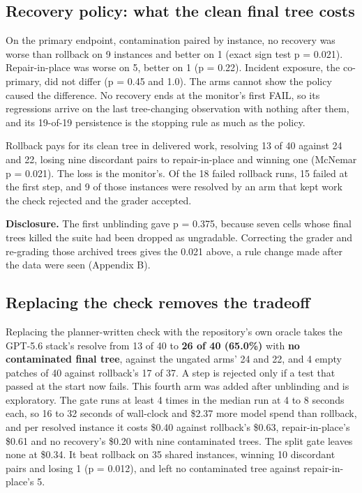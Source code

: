 \documentclass{article}
\begin{document}
\subsection{Recovery policy: what the clean final tree costs}

On the primary endpoint, contamination paired by instance, no recovery was worse than rollback on 9 instances and better on 1 (exact sign test p = 0.021). Repair-in-place was worse on 5, better on 1 (p = 0.22). Incident exposure, the co-primary, did not differ (p = 0.45 and 1.0). The arms cannot show the policy caused the difference. No recovery ends at the monitor's first FAIL, so its regressions arrive on the last tree-changing observation with nothing after them, and its 19-of-19 persistence is the stopping rule as much as the policy.

Rollback pays for its clean tree in delivered work, resolving 13 of 40 against 24 and 22, losing nine discordant pairs to repair-in-place and winning one (McNemar p = 0.021). The loss is the monitor's. Of the 18 failed rollback runs, 15 failed at the first step, and 9 of those instances were resolved by an arm that kept work the check rejected and the grader accepted.

\textbf{Disclosure.} The first unblinding gave p = 0.375, because seven cells whose final trees killed the suite had been dropped as ungradable. Correcting the grader and re-grading those archived trees gives the 0.021 above, a rule change made after the data were seen (Appendix B).

\subsection{Replacing the check removes the tradeoff}

Replacing the planner-written check with the repository's own oracle takes the GPT-5.6 stack's resolve from 13 of 40 to \textbf{26 of 40 (65.0\%)} with \textbf{no contaminated final tree}, against the ungated arms' 24 and 22, and 4 empty patches of 40 against rollback's 17 of 37. A step is rejected only if a test that passed at the start now fails. This fourth arm was added after unblinding and is exploratory. The gate runs at least 4 times in the median run at 4 to 8 seconds each, so 16 to 32 seconds of wall-clock and \$2.37 more model spend than rollback, and per resolved instance it costs \$0.40 against rollback's \$0.63, repair-in-place's \$0.61 and no recovery's \$0.20 with nine contaminated trees. The split gate leaves none at \$0.34. It beat rollback on 35 shared instances, winning 10 discordant pairs and losing 1 (p = 0.012), and left no contaminated tree against repair-in-place's 5.
\end{document}
